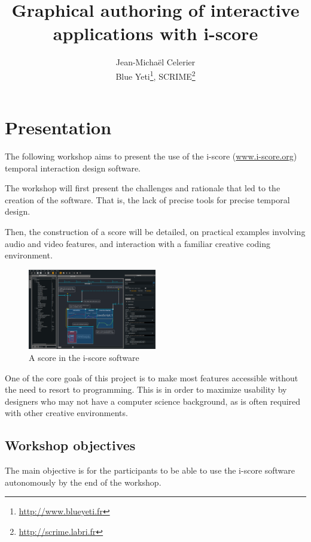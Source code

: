 \documentclass[11pt]{article}
\title{Graphical authoring of interactive applications with i-score}
\author{Jean-Michaël Celerier\\ \small Blue Yeti\thanks{\url{http://www.blueyeti.fr}}, SCRIME\thanks{\url{http://scrime.labri.fr}}}
\date{}
\begin{document}
\maketitle
\vspace{-3cm}
\section*{Presentation}
The following workshop aims to present the use of the i-score (\url{www.i-score.org}) temporal interaction design software.

The workshop will first present the challenges and rationale that led to the creation of the software.
That is, the lack of precise tools for precise temporal design.

Then, the construction of a score will be detailed, on practical examples involving audio and video features, and interaction with a familiar creative coding environment.

\begin{figure}[h]
	\centering
	\includegraphics[width=0.5\textwidth]{images/iscore.png}
	\caption*{A score in the i-score software}
\end{figure}

One of the core goals of this project is to make most features accessible without the need to resort to programming. This is in order to maximize usability by designers who may not have a computer science background, as is often required with other creative environments.
\subsection*{Workshop objectives}
The main objective is for the participants to be able to use the i-score software autonomously by the end of the workshop.
\end{document}
